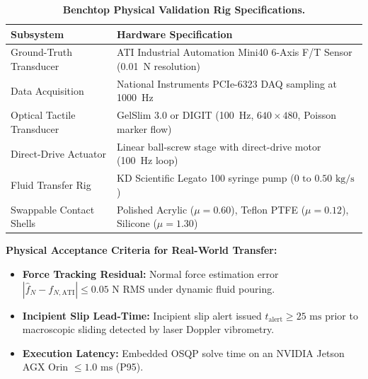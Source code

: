 \begin{table}[h]
\centering
\caption{\textbf{Benchtop Physical Validation Rig Specifications.}}
\label{tab:benchtop}
\small
\begin{tabular}{ll}
\toprule
\textbf{Subsystem} & \textbf{Hardware Specification} \\
\midrule
Ground-Truth Transducer & ATI Industrial Automation Mini40 6-Axis F/T Sensor (0.01~N resolution) \\
Data Acquisition & National Instruments PCIe-6323 DAQ sampling at 1000~Hz \\
Optical Tactile Transducer & GelSlim 3.0 or DIGIT (100~Hz, $640\times 480$, Poisson marker flow) \\
Direct-Drive Actuator & Linear ball-screw stage with direct-drive motor (100~Hz loop) \\
Fluid Transfer Rig & KD Scientific Legato 100 syringe pump ($0\text{ to }0.50\text{ kg/s}$) \\
Swappable Contact Shells & Polished Acrylic ($\mu = 0.60$), Teflon PTFE ($\mu = 0.12$), Silicone ($\mu = 1.30$) \\
\bottomrule
\end{tabular}
\end{table}

\textbf{Physical Acceptance Criteria for Real-World Transfer:}
\begin{itemize}
    \item \textbf{Force Tracking Residual:} Normal force estimation error $|\hat{f}_N - f_{N, \text{ATI}}| \le 0.05\text{ N}$ RMS under dynamic fluid pouring.
    \item \textbf{Incipient Slip Lead-Time:} Incipient slip alert issued $t_{\text{alert}} \ge 25\text{ ms}$ prior to macroscopic sliding detected by laser Doppler vibrometry.
    \item \textbf{Execution Latency:} Embedded OSQP solve time on an NVIDIA Jetson AGX Orin $\le 1.0\text{ ms}$ (P95).
\end{itemize}
